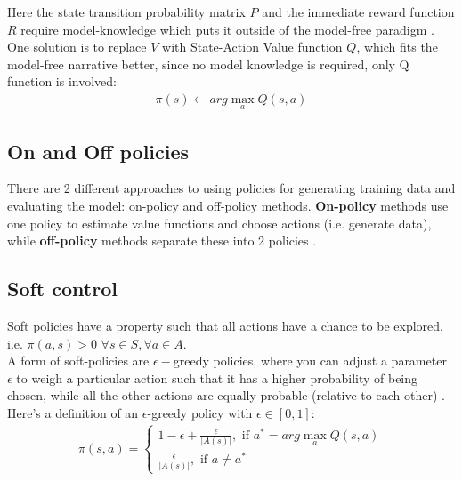 Here the state transition probability matrix $P$ and 
the immediate reward function $R$ require model-knowledge
which puts it outside of the model-free paradigm \cite{lecture_mfc}. One solution is to replace $V$ with 
State-Action Value function $Q$, which fits the 
model-free narrative better, since no model knowledge
is required, only Q function is involved:  
\begin{align}
    \pi(s) \leftarrow arg \max_{a} Q(s, a) 
\end{align}

\subsection{On and Off policies}
There are 2 different approaches to using policies for 
generating training data and evaluating the model: on-policy and
off-policy methods.
\textbf{On-policy} methods use one policy to estimate value functions and choose actions (i.e. generate data), while \textbf{off-policy} methods separate these into 2 policies \cite{lecture_mfc}. 

\subsection{Soft control}

Soft policies have a property such that all actions have a chance to be explored, i.e. $\pi(a, s) > 0$ $\forall s \in S, \forall a \in A.$\\

A form of soft-policies are $\epsilon-$greedy policies, where 
you can adjust a parameter $\epsilon$ to weigh a particular action such that it has a higher probability of being chosen,
while all the other actions are equally probable (relative to each other) \cite{lecture_mfc}. Here's a definition of an $\epsilon$-greedy policy with $\epsilon \in [0, 1]$:
\begin{align}
    \pi(s, a) = \begin{cases} 
        1 - \epsilon + \frac{\epsilon}{|A(s)|}, \text{ if } a^{*} = arg \max_{a} Q(s, a) \\
        \frac{\epsilon}{|A(s)|}, \text{ if }  a \neq a^*
    \end{cases}   
\end{align}

